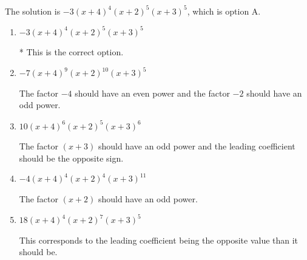 \documentclass{extbook}[14pt]
\begin{document}
\begin{enumerate}
{The solution is \( -3(x + 4)^{4} (x + 2)^{5} (x + 3)^{5} \), which is option A.\begin{enumerate}[label=\Alph*.]
\item \( -3(x + 4)^{4} (x + 2)^{5} (x + 3)^{5} \)

* This is the correct option.
\item \( -7(x + 4)^{9} (x + 2)^{10} (x + 3)^{5} \)

The factor $-4$ should have an even power and the factor $-2$ should have an odd power.
\item \( 10(x + 4)^{6} (x + 2)^{5} (x + 3)^{6} \)

The factor $(x + 3)$ should have an odd power and the leading coefficient should be the opposite sign.
\item \( -4(x + 4)^{4} (x + 2)^{4} (x + 3)^{11} \)

The factor $(x + 2)$ should have an odd power.
\item \( 18(x + 4)^{4} (x + 2)^{7} (x + 3)^{5} \)

This corresponds to the leading coefficient being the opposite value than it should be.
\end{enumerate}

}
\end{enumerate}
\end{document}
